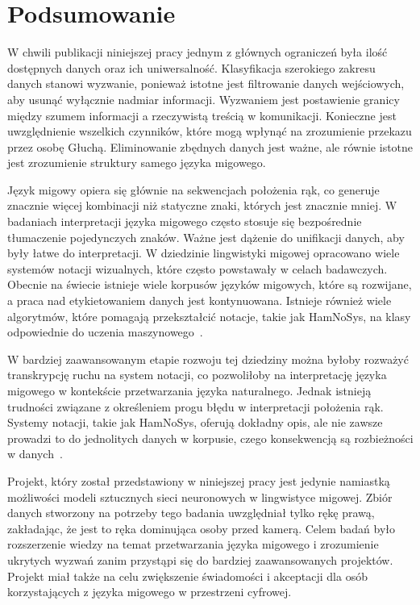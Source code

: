 \hypersetup{pageanchor=true}

\chapter{Podsumowanie}\label{ch:summary}

W chwili publikacji niniejszej pracy jednym z głównych ograniczeń była ilość dostępnych danych oraz ich uniwersalność. Klasyfikacja szerokiego zakresu danych stanowi wyzwanie, ponieważ istotne jest filtrowanie danych wejściowych, aby usunąć wyłącznie nadmiar informacji. Wyzwaniem jest postawienie granicy między szumem informacji a rzeczywistą treścią w komunikacji. Konieczne jest uwzględnienie wszelkich czynników, które mogą wpłynąć na zrozumienie przekazu przez osobę Głuchą. Eliminowanie zbędnych danych jest ważne, ale równie istotne jest zrozumienie struktury samego języka migowego.

Język migowy opiera się głównie na sekwencjach położenia rąk, co generuje znacznie więcej kombinacji niż statyczne znaki, których jest znacznie mniej. W badaniach interpretacji języka migowego często stosuje się bezpośrednie tłumaczenie pojedynczych znaków. Ważne jest dążenie do unifikacji danych, aby były łatwe do interpretacji. W dziedzinie lingwistyki migowej opracowano wiele systemów notacji wizualnych, które często powstawały w celach badawczych. Obecnie na świecie istnieje wiele korpusów języków migowych, które są rozwijane, a praca nad etykietowaniem danych jest kontynuowana. Istnieje również wiele algorytmów, które pomagają przekształcić notacje, takie jak HamNoSys, na klasy odpowiednie do uczenia maszynowego~\cite{majchrowska2022}.

W bardziej zaawansowanym etapie rozwoju tej dziedziny można byłoby rozważyć transkrypcję ruchu na system notacji, co pozwoliłoby na interpretację języka migowego w kontekście przetwarzania języka naturalnego. Jednak istnieją trudności związane z określeniem progu błędu w interpretacji położenia rąk. Systemy notacji, takie jak HamNoSys, oferują dokładny opis, ale nie zawsze prowadzi to do jednolitych danych w korpusie, czego konsekwencją są rozbieżności w danych~\cite{ferlin2023}.

Projekt, który został przedstawiony w niniejszej pracy jest jedynie namiastką możliwości modeli sztucznych sieci neuronowych w lingwistyce migowej. Zbiór danych stworzony na potrzeby tego badania uwzględniał tylko rękę prawą, zakładając, że jest to ręka dominująca osoby przed kamerą. Celem badań było rozszerzenie wiedzy na temat przetwarzania języka migowego i zrozumienie ukrytych wyzwań zanim przystąpi się do bardziej zaawansowanych projektów. Projekt miał także na celu zwiększenie świadomości i akceptacji dla osób korzystających z języka migowego w przestrzeni cyfrowej.
